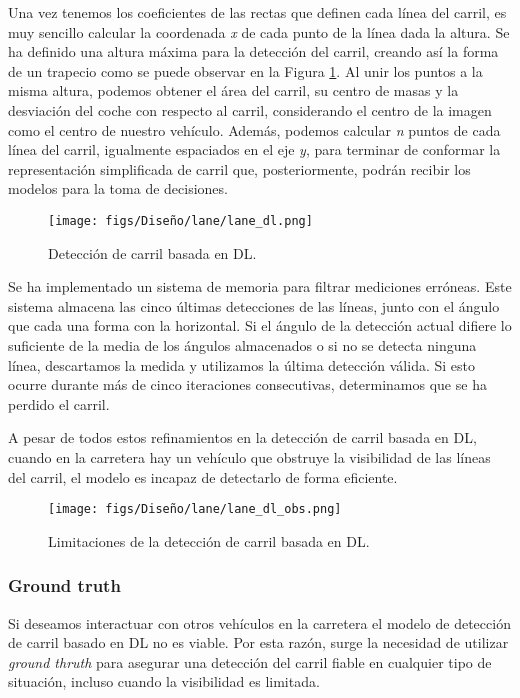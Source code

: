 Una vez tenemos los coeficientes de las rectas que definen cada línea del carril, es muy sencillo calcular la coordenada \textit{x} de cada punto de la línea dada la altura. Se ha definido una altura máxima para la detección del carril, creando así la forma de un trapecio como se puede observar en la Figura \ref{fig:dl_final_carril}. Al unir los puntos a la misma altura, podemos obtener el área del carril, su centro de masas y la desviación del coche con respecto al carril, considerando el centro de la imagen como el centro de nuestro vehículo. Además, podemos calcular \textit{n} puntos de cada línea del carril, igualmente espaciados en el eje \textit{y}, para terminar de conformar la representación simplificada de carril que, posteriormente, podrán recibir los modelos para la toma de decisiones.

\begin{figure}[ht]
\centering
\texttt{[image: figs/Diseño/lane/lane\_dl.png]}
\caption{Detección de carril basada en \ac{DL}.}
\label{fig:dl_final_carril}
\end{figure}

Se ha implementado un sistema de memoria para filtrar mediciones erróneas. Este sistema almacena las cinco últimas detecciones de las líneas, junto con el ángulo que cada una forma con la horizontal. Si el ángulo de la detección actual difiere lo suficiente de la media de los ángulos almacenados o si no se detecta ninguna línea, descartamos la medida y utilizamos la última detección válida. Si esto ocurre durante más de cinco iteraciones consecutivas, determinamos que se ha perdido el carril.

A pesar de todos estos refinamientos en la detección de carril basada en \ac{DL}, cuando en la carretera hay un vehículo que obstruye la visibilidad de las líneas del carril, el modelo es incapaz de detectarlo de forma eficiente.

\begin{figure}[ht]
\centering
\texttt{[image: figs/Diseño/lane/lane\_dl\_obs.png]}
\caption{Limitaciones de la detección de carril basada en \ac{DL}.}
\label{fig:dl_final_carril_obs}
\end{figure}

\subsubsection{Ground truth}

Si deseamos interactuar con otros vehículos en la carretera el modelo de detección de carril basado en \ac{DL} no es viable. Por esta razón, surge la necesidad de utilizar \textit{ground thruth} para asegurar una detección del carril fiable en cualquier tipo de situación, incluso cuando la visibilidad es limitada. 

